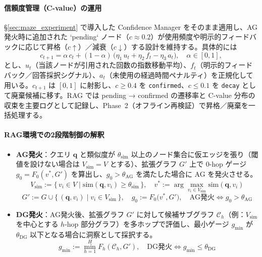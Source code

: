 \documentclass[ja=standard,xelatex]{bxjsarticle}
\begin{document}
\paragraph{信頼度管理（C-value）の運用}
\S\ref{sec:maze_experiment} で導入した Confidence Manager をそのまま適用し、AG発火時に追加された `pending` ノード（$c\approx0.2$）が使用頻度や明示的フィードバックに応じて昇格（$c \uparrow$）／減衰（$c \downarrow$）する設計を維持する。具体的には
\begin{equation}
  c_{t+1} = \alpha\,c_t + (1-\alpha)\,\bigl(\eta_1\,u_t + \eta_2\,f_t - \eta_3\,a_t\bigr),\quad \alpha\in[0,1],
  \label{eq:cvalue_update}
\end{equation}
とし、$u_t$（当該ノードが引用された回数の指数移動平均）、$f_t$（明示的フィードバック／回答採択シグナル）、$a_t$（未使用の経過時間ペナルティ）を正規化して用いる。$c_{t+1}$ は $[0,1]$ に射影し、$c\ge 0.4$ を \texttt{confirmed}、$c\le 0.1$ を \texttt{decay} として廃棄候補に移す。RAG では pending → confirmed の遷移率と C-value 分布の収束を主要ログとして記録し、Phase~2（オフライン再検証）で昇格／廃棄を一括処理する。

\paragraph{RAG環境での2段階制御の解釈}
\begin{itemize}
  \item \textbf{AG発火}：クエリ $\mathbf{q}$ と類似度が $\theta_{\mathrm{sim}}$ 以上のノード集合に仮エッジを張り（閾値を設けない場合は $V_{\mathrm{sim}}{=}V$ とする）、拡張グラフ $G'$ 上で 0-hop ゲージ $g_0=F_0(v^*, G')$ を算出し、$g_0 > \theta_{\mathrm{AG}}$ を満たした場合に AG を発火させる。
  \begin{equation}
    V_{\mathrm{sim}} := \{\, v_i \in V \mid \mathrm{sim}(\mathbf{q}, v_i) \ge \theta_{\mathrm{sim}} \,\},\quad
    v^* := \arg\max_{v_i \in V_{\mathrm{sim}}} \mathrm{sim}(\mathbf{q}, v_i)
  \end{equation}
  \begin{equation}
    G' := G \cup \{\, (\mathbf{q}, v_i) \mid v_i \in V_{\mathrm{sim}} \,\},\quad
    g_0 := F_0\big(v^*, G'\big),\quad
    \text{AG発火} \iff g_0 > \theta_{\mathrm{AG}}
  \end{equation}

  \item \textbf{DG発火}：AG発火後、拡張グラフ $G'$ に対して候補サブグラフ $\mathcal{C}_h$（例：$V_{\mathrm{sim}}$ を中心とする $h$-hop 部分グラフ）を多ホップで評価し、最小ゲージ $g_{\min}$ が $\theta_{\mathrm{DG}}$ 以下となる場合に洞察として採択する。
  \begin{equation}
    g_{\min} := \min_{h=1}^{H} F_h(\mathcal{C}_h, G'),\quad
    \text{DG発火} \iff g_{\min} \le \theta_{\mathrm{DG}}
  \end{equation}
\end{itemize}
\end{document}
